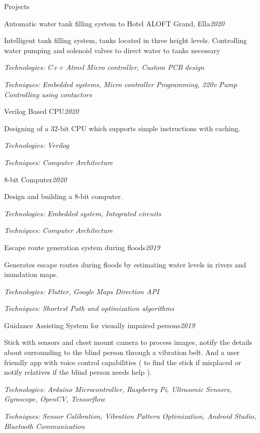 \documentclass{resume} %
\begin{document}
\begin{rSection}{Projects}
\begin{rSubsection}{Automatic water tank filling system to Hotel ALOFT Grand, Ella}{\em {2020}}{}{}
\item Intelligent tank filling system, tanks located in three height levels. Controlling water pumping and solenoid valves to direct water to tanks necessary\item 
\textit{Technologies: C++ Atmel Micro controller, Custom PCB design }
\item \textit{Techniques: Embedded systems, Micro controller Programming, 220v Pump Controlling using contactors }
\end{rSubsection}

\begin{rSubsection}{Verilog Based CPU}{\em {2020}}{}{}
\item Designing of a 32-bit CPU which supports simple instructions with caching. \item 
\textit{Technologies: Verilog}
\item \textit{Techniques: Computer Architecture }
\end{rSubsection}


\begin{rSubsection}{8-bit Computer}{\em {2020}}{}{}
\item Design and building a 8-bit computer. \item 
\textit{Technologies: Embedded system, Integrated circuits}
\item \textit{Techniques: Computer Architecture }
\end{rSubsection}

\begin{rSubsection}{Escape route generation system during floods}{\em {2019}}{}{}
\item Generates escape routes during floods by estimating water levels in rivers and inundation maps. \item 
\textit{Technologies: Flutter, Google Maps Direction API}
\item \textit{Techniques: Shortest Path and optimization algorithms}
\end{rSubsection}



\begin{rSubsection}{Guidance Assisting System for visually impaired persons}{\em {2019}}{}{}
\item Stick with sensors and chest mount camera to process images, notify the details about surrounding to the blind person through a vibration belt. And a user friendly app with voice control capabilities ( to find the stick if misplaced or notify relatives if the blind person needs help ). 
\item \textit{Technologies: Arduino Microcontroller, Raspberry Pi, Ultrasonic Sensors, Gyroscope, OpenCV, Tensorflow} 
\item \textit{Techniques: Sensor Calibration, Vibration Pattern Optimization, Android Studio, Bluetooth Communication}
\end{rSubsection}


\end{rSection}
\end{document}
